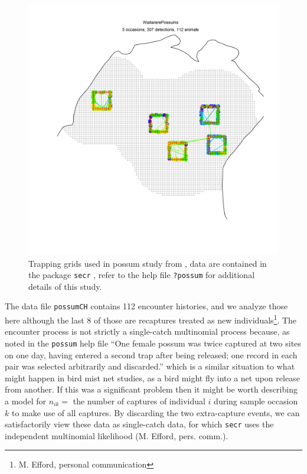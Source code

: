 \begin{figure}
\centering
\includegraphics[width=5in]{Ch5-PoisMn/figs/possum.png}
\caption{Trapping grids used in possum study from
  \citet{efford_etal:2005}, data are contained in the \R
package \mbox{\tt secr}
\citep{efford:2011}, refer to the help file \mbox{\tt ?possum} for
additional details of this study.}
\label{poisson-mn.fig.possum}
\end{figure}

The data file \mbox{\tt possumCH} contains 112 encounter histories,
and we analyze those here although the last 8 of those are recaptures
treated as new individuals\footnote{M. Efford, personal communication}.
The encounter process is not strictly a single-catch multinomial process because,
as noted in the \mbox{\tt possum} help file
 ``One female possum was twice captured at two
sites on one day, having entered a second trap after being released;
one record in each pair was selected arbitrarily and discarded.''
which is a similar situation to what might happen in bird mist net
studies, as a bird might fly into a net upon release from another.
If this was a significant problem then it might be worth describing a
model for $n_{ik} = $ the number of captures of individual $i$ during
sample occasion $k$ to make use of all captures. By discarding the two
extra-capture events, we can satisfactorily view these data as
single-catch data, for which \mbox{\tt secr} uses the independent
multinomial likelihood (M. Efford, pers. comm.).

